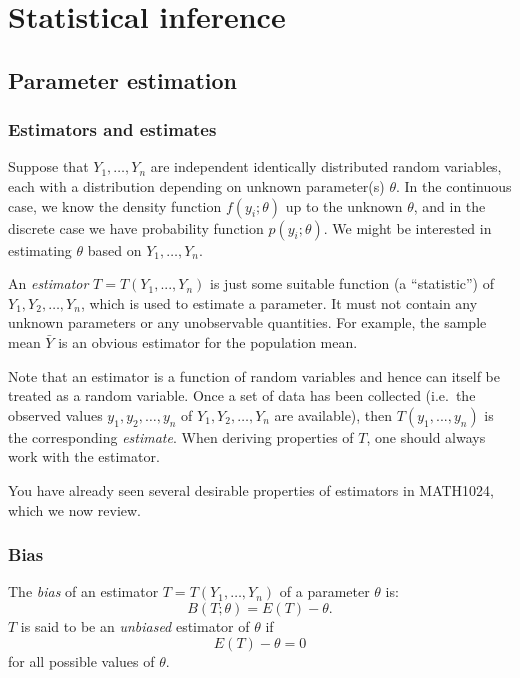 \documentclass[]{book}
\theoremstyle{definition}
\theoremstyle{definition}
\theoremstyle{definition}
\theoremstyle{remark}
\let\BeginKnitrBlock\begin \let\EndKnitrBlock\end
\begin{document}
\part{Statistical
inference}\label{part-statistical-inference}

\chapter{Parameter estimation}\label{estimation}

\section{Estimators and estimates}\label{estimators-and-estimates}

Suppose that \(Y_1, \ldots, Y_n\) are independent identically
distributed random variables, each with a distribution depending on
unknown parameter(s) \(\theta\). In the continuous case, we know the
density function \(f(y_i; \theta)\) up to the unknown \(\theta\), and in
the discrete case we have probability function \(p(y_i; \theta)\). We
might be interested in estimating \(\theta\) based on
\(Y_1, \ldots, Y_n\).

An \emph{estimator} \(T = T(Y_1, ...,Y_n)\) is just some suitable
function (a ``statistic'') of \(Y_1, Y_2, \ldots, Y_n\), which is used
to estimate a parameter. It must not contain any unknown parameters or
any unobservable quantities. For example, the sample mean \(\bar Y\) is
an obvious estimator for the population mean.

Note that an estimator is a function of random variables and hence can
itself be treated as a random variable. Once a set of data has been
collected (i.e.~the observed values \(y_1, y_2, \ldots ,y_n\) of
\(Y_1, Y_2, \ldots, Y_n\) are available), then \(T(y_1, ...,y_n)\) is
the corresponding \emph{estimate}. When deriving properties of \(T\),
one should always work with the estimator.

You have already seen several desirable properties of estimators in
MATH1024, which we now review.

\section{Bias}\label{bias}

\BeginKnitrBlock{definition}
\protect\hypertarget{def:unnamed-chunk-87}{}{\label{def:unnamed-chunk-87}
}The \emph{bias} of an estimator \(T = T(Y_1, \ldots, Y_n)\) of a
parameter \(\theta\) is: \[B(T; \theta) = E(T) - \theta.\] \(T\) is said
to be an \emph{unbiased} estimator of \(\theta\) if
\[E(T) - \theta = 0\] for all possible values of \(\theta\).
\EndKnitrBlock{definition}
\end{document}
